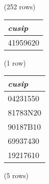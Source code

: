 \noindent (252 rows) \\

\begin{tabular}{l}
\textit{cusip} \\
\hline
41959620 \\
\end{tabular}

\noindent (1 row) \\

\begin{tabular}{l}
\textit{cusip} \\
\hline
04231550 \\
81783N20 \\
90187B10 \\
69937430 \\
19217610 \\
\end{tabular}

\noindent (5 rows) \\

